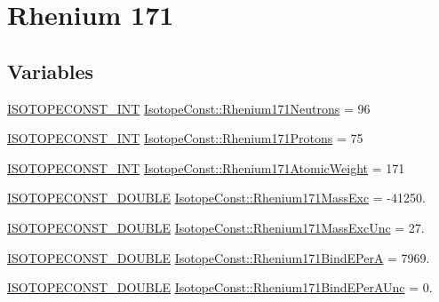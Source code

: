 \hypertarget{group___isotope_const-_rhenium-_re171}{}\section{Rhenium 171}
\label{group___isotope_const-_rhenium-_re171}
\subsection*{Variables}
\begin{DoxyCompactItemize}
\item 
\mbox{\hyperlink{group___isotope_const-_macros_ga5f18360b3e99483a35c32d789e62621c}{I\+S\+O\+T\+O\+P\+E\+C\+O\+N\+S\+T\+\_\+\+I\+NT}} \mbox{\hyperlink{group___isotope_const-_rhenium-_re171_ga61a49af07a1fb7cead643c667978c76d}{Isotope\+Const\+::\+Rhenium171\+Neutrons}} = 96
\item 
\mbox{\hyperlink{group___isotope_const-_macros_ga5f18360b3e99483a35c32d789e62621c}{I\+S\+O\+T\+O\+P\+E\+C\+O\+N\+S\+T\+\_\+\+I\+NT}} \mbox{\hyperlink{group___isotope_const-_rhenium-_re171_ga534677f833bc3363e4fc59b4029950c2}{Isotope\+Const\+::\+Rhenium171\+Protons}} = 75
\item 
\mbox{\hyperlink{group___isotope_const-_macros_ga5f18360b3e99483a35c32d789e62621c}{I\+S\+O\+T\+O\+P\+E\+C\+O\+N\+S\+T\+\_\+\+I\+NT}} \mbox{\hyperlink{group___isotope_const-_rhenium-_re171_gade9f567b93ca24be8cfa82aee7913cd0}{Isotope\+Const\+::\+Rhenium171\+Atomic\+Weight}} = 171
\item 
\mbox{\hyperlink{group___isotope_const-_macros_ga8f45a7272ce02c0b4c65c44636ed719a}{I\+S\+O\+T\+O\+P\+E\+C\+O\+N\+S\+T\+\_\+\+D\+O\+U\+B\+LE}} \mbox{\hyperlink{group___isotope_const-_rhenium-_re171_ga0ebf11e346b5e92bfb6cd46565086060}{Isotope\+Const\+::\+Rhenium171\+Mass\+Exc}} = -\/41250.
\item 
\mbox{\hyperlink{group___isotope_const-_macros_ga8f45a7272ce02c0b4c65c44636ed719a}{I\+S\+O\+T\+O\+P\+E\+C\+O\+N\+S\+T\+\_\+\+D\+O\+U\+B\+LE}} \mbox{\hyperlink{group___isotope_const-_rhenium-_re171_ga4ed8bc2fb0dabc0256b2d1651c34e4cd}{Isotope\+Const\+::\+Rhenium171\+Mass\+Exc\+Unc}} = 27.
\item 
\mbox{\hyperlink{group___isotope_const-_macros_ga8f45a7272ce02c0b4c65c44636ed719a}{I\+S\+O\+T\+O\+P\+E\+C\+O\+N\+S\+T\+\_\+\+D\+O\+U\+B\+LE}} \mbox{\hyperlink{group___isotope_const-_rhenium-_re171_gaa55597144c21188376ef0eebf0bdf3e1}{Isotope\+Const\+::\+Rhenium171\+Bind\+E\+PerA}} = 7969.
\item 
\mbox{\hyperlink{group___isotope_const-_macros_ga8f45a7272ce02c0b4c65c44636ed719a}{I\+S\+O\+T\+O\+P\+E\+C\+O\+N\+S\+T\+\_\+\+D\+O\+U\+B\+LE}} \mbox{\hyperlink{group___isotope_const-_rhenium-_re171_gad19e8c166f6342582c890fafb87d6199}{Isotope\+Const\+::\+Rhenium171\+Bind\+E\+Per\+A\+Unc}} = 0.

\end{DoxyCompactItemize}
